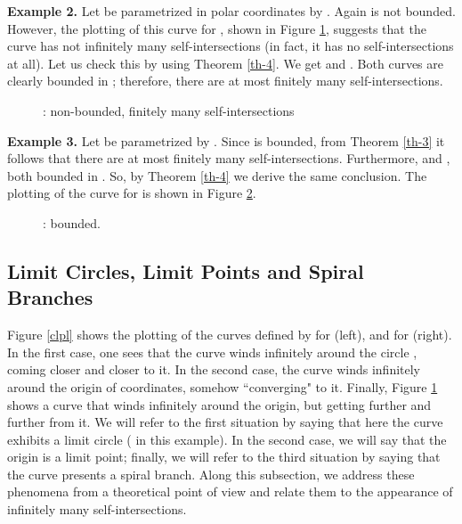 \documentclass{elsart}
\begin{document}
{\bf Example 2.} Let  be parametrized in polar coordinates by . Again
 is not bounded. However, the plotting of this curve for , shown in Figure
\ref{ej2}, suggests that the curve has not infinitely many self-intersections (in fact, it has no self-intersections at all). Let us check this by using
Theorem \ref{th-4}. We get
 and . Both curves are clearly bounded in ; therefore, there are at most finitely many
self-intersections.

\begin{figure}[ht]
\begin{center}
\centerline{  }
\end{center}
\caption{:  non-bounded, finitely many self-intersections}\label{ej2}
\end{figure}

{\bf Example 3.} Let  be parametrized by . Since
 is bounded, from Theorem \ref{th-3} it follows that there are at most finitely many
self-intersections. Furthermore,   and
, both bounded in . So, by Theorem \ref{th-4} we derive the same
conclusion. The plotting of the curve for  is shown in Figure \ref{ej3}.

\begin{figure}[ht]
\begin{center}
\centerline{  }
\end{center}
\caption{:  bounded.}\label{ej3}
\end{figure}

\subsection{Limit Circles, Limit Points and Spiral Branches}\label{subsec-limit}

Figure \ref{clpl} shows the plotting of the curves defined by  for  (left), and  for  (right). In the first case, one sees that the curve winds infinitely around
the circle , coming closer and closer to it. In the second case, the curve winds
infinitely around the origin of coordinates, somehow ``converging" to it. Finally,  Figure
\ref{ej2} shows a curve that winds infinitely around the origin, but getting further and further from it.  We will refer to the first situation by saying that here the curve exhibits a {\sf limit circle} (
in this example).
In the second case, we will say that the origin is a {\sf limit point}; finally, we will refer to the third situation by saying
that the curve presents a {\sf spiral branch}. Along this subsection, we address these phenomena from a theoretical point of view and relate them to the appearance of infinitely many self-intersections.
\end{document}
